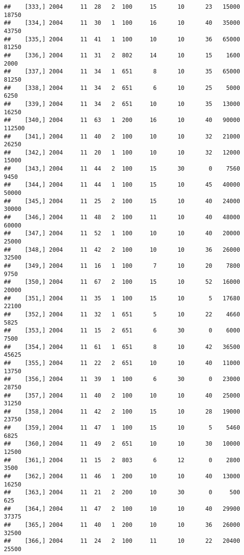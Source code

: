 \documentclass{article}\usepackage[]{graphicx}\usepackage[]{color}
\makeatletter
\newenvironment{kframe}{%
 \def\at@end@of@kframe{}%
 \ifinner\ifhmode%
  \def\at@end@of@kframe{\end{minipage}}%
  \begin{minipage}{\columnwidth}%
 \fi\fi%
 \def\FrameCommand##1{\hskip\@totalleftmargin \hskip-\fboxsep
 \colorbox{shadecolor}{##1}\hskip-\fboxsep
     \hskip-\linewidth \hskip-\@totalleftmargin \hskip\columnwidth}%
 \MakeFramed {\advance\hsize-\width
   \@totalleftmargin\z@ \linewidth\hsize
   \@setminipage}}%
 {\par\unskip\endMakeFramed%
 \at@end@of@kframe}
\newenvironment{knitrout}{}{} %
\makeatother
\begin{document}
\begin{knitrout}
\begin{kframe}
\begin{verbatim}
##    [333,] 2004     11  28   2  100     15      10      23   15000   18750
##    [334,] 2004     11  30   1  100     16      10      40   35000   43750
##    [335,] 2004     11  41   1  100     10      10      36   65000   81250
##    [336,] 2004     11  31   2  802     14      10      15    1600    2000
##    [337,] 2004     11  34   1  651      8      10      35   65000   81250
##    [338,] 2004     11  34   2  651      6      10      25    5000    6250
##    [339,] 2004     11  34   2  651     10      10      35   13000   16250
##    [340,] 2004     11  63   1  200     16      10      40   90000  112500
##    [341,] 2004     11  40   2  100     10      10      32   21000   26250
##    [342,] 2004     11  20   1  100     10      10      32   12000   15000
##    [343,] 2004     11  44   2  100     15      30       0    7560    9450
##    [344,] 2004     11  44   1  100     15      10      45   40000   50000
##    [345,] 2004     11  25   2  100     15      10      40   24000   30000
##    [346,] 2004     11  48   2  100     11      10      40   48000   60000
##    [347,] 2004     11  52   1  100     10      10      40   20000   25000
##    [348,] 2004     11  42   2  100     10      10      36   26000   32500
##    [349,] 2004     11  16   1  100      7      10      20    7800    9750
##    [350,] 2004     11  67   2  100     15      10      52   16000   20000
##    [351,] 2004     11  35   1  100     15      10       5   17680   22100
##    [352,] 2004     11  32   1  651      5      10      22    4660    5825
##    [353,] 2004     11  15   2  651      6      30       0    6000    7500
##    [354,] 2004     11  61   1  651      8      10      42   36500   45625
##    [355,] 2004     11  22   2  651     10      10      40   11000   13750
##    [356,] 2004     11  39   1  100      6      30       0   23000   28750
##    [357,] 2004     11  40   2  100     10      10      40   25000   31250
##    [358,] 2004     11  42   2  100     15      10      28   19000   23750
##    [359,] 2004     11  47   1  100     15      10       5    5460    6825
##    [360,] 2004     11  49   2  651     10      10      30   10000   12500
##    [361,] 2004     11  15   2  803      6      12       0    2800    3500
##    [362,] 2004     11  46   1  200     10      10      40   13000   16250
##    [363,] 2004     11  21   2  200     10      30       0     500     625
##    [364,] 2004     11  47   2  100     10      10      40   29900   37375
##    [365,] 2004     11  40   1  200     10      10      36   26000   32500
##    [366,] 2004     11  24   2  100     11      10      22   20400   25500

\end{verbatim}
\end{kframe}
\end{knitrout}
\end{document}
